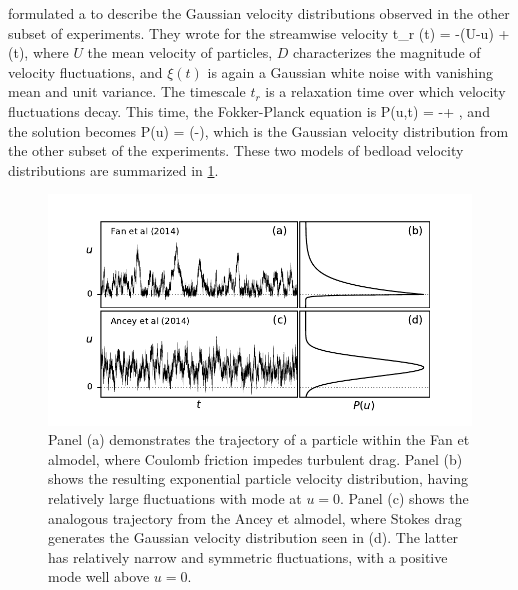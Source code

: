 \citet{Ancey2014} formulated a \DIFdelbegin {}\DIFdelend \DIFaddbegin {}\DIFaddend to describe the Gaussian velocity distributions observed in the other subset of experiments. They wrote for the streamwise velocity 
\be t_r (t) = -(U-u) + \xi(t),\ee
where $U$ \DIFdelbegin {}\DIFdelend \DIFaddbegin {}\DIFaddend the mean velocity of particles, $D$ characterizes the magnitude of velocity fluctuations, and $\xi(t)$ is again a Gaussian white noise with vanishing mean and unit variance. The timescale $t_r$ is a relaxation time over which velocity fluctuations decay. This time, the Fokker-Planck equation is
\be {} P(u,t) = - + ,\ee 
and the \DIFdelbegin {}\DIFdelend \DIFaddbegin {}\DIFaddend solution becomes
\be P(u) =  \exp\Big(-\Big), \ee
which is the Gaussian velocity distribution from the other subset of the experiments.
These two models of bedload velocity distributions are summarized in \DIFdelbegin {}\DIFdelend \DIFaddbegin {}\DIFaddend \ref{fig:fanAncey}.
\begin{figure}[!htbp]
	\includegraphics[width=\linewidth,keepaspectratio]{./figures/ch1/fanAncey.pdf}
	\caption{Panel (a) demonstrates the trajectory of a particle within the Fan et al\DIFaddbeginFL {}\DIFaddendFL model, where Coulomb friction impedes turbulent drag. Panel (b) shows the resulting exponential particle velocity distribution, having relatively large fluctuations with mode at $u=0$.
	Panel (c) shows the analogous trajectory from the Ancey et al\DIFaddbeginFL {}\DIFaddendFL model, where \DIFdelbeginFL {}\DIFdelendFL \DIFaddbeginFL {}\DIFaddendFL Stokes drag generates the Gaussian velocity distribution seen in \DIFaddbeginFL {}\DIFaddendFL (d). The latter has relatively narrow and symmetric fluctuations, with a positive mode well above $u=0$.}
	\label{fig:fanAncey}
\end{figure}

